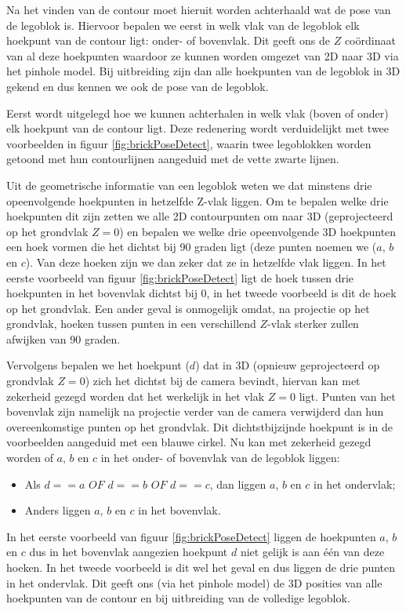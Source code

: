 Na het vinden van de contour moet hieruit worden achterhaald wat de pose van de legoblok is. Hiervoor bepalen we eerst in welk vlak van de legoblok elk hoekpunt van de contour ligt: onder- of bovenvlak. Dit geeft ons de $Z$ co\"ordinaat van al deze hoekpunten waardoor ze kunnen worden omgezet van 2D naar 3D via het pinhole model. Bij uitbreiding zijn dan alle hoekpunten van de legoblok in 3D gekend en dus kennen we ook de pose van de legoblok.

Eerst wordt uitgelegd hoe we kunnen achterhalen in welk vlak (boven of onder) elk hoekpunt van de contour ligt. Deze redenering wordt verduidelijkt met twee voorbeelden in figuur \ref{fig:brickPoseDetect}, waarin twee legoblokken worden getoond met hun contourlijnen aangeduid met de vette zwarte lijnen.

Uit de geometrische informatie van een legoblok weten we dat minstens drie opeenvolgende hoekpunten in hetzelfde Z-vlak liggen. Om te bepalen welke drie hoekpunten dit zijn zetten we alle 2D contourpunten om naar 3D (geprojecteerd op het grondvlak $Z = 0$) en bepalen we welke drie opeenvolgende 3D hoekpunten een hoek vormen die het dichtst bij 90 graden ligt (deze punten noemen we ($a$, $b$ en $c$). Van deze hoeken zijn we dan zeker dat ze in hetzelfde vlak liggen. In het eerste voorbeeld van figuur \ref{fig:brickPoseDetect} ligt de hoek tussen drie hoekpunten in het bovenvlak dichtst bij 0, in het tweede voorbeeld is dit de hoek op het grondvlak. Een ander geval is onmogelijk omdat, na projectie op het grondvlak, hoeken tussen punten in een verschillend $Z$-vlak sterker zullen afwijken van 90 graden.

Vervolgens bepalen we het hoekpunt ($d$) dat in 3D (opnieuw geprojecteerd op grondvlak $Z = 0$) zich het dichtst bij de camera bevindt, hiervan kan met zekerheid gezegd worden dat het werkelijk in het vlak $Z = 0$ ligt. Punten van het bovenvlak zijn namelijk na projectie verder van de camera verwijderd dan hun overeenkomstige punten op het grondvlak. Dit dichtstbijzijnde hoekpunt is in de voorbeelden aangeduid met een blauwe cirkel. Nu kan met zekerheid gezegd worden of $a$, $b$ en $c$ in het onder- of bovenvlak van de legoblok liggen: 
\begin{itemize}
\item Als $d == a$ $OF$ $d == b$ $OF$ $d == c$, dan liggen $a$, $b$ en $c$ in het ondervlak;
\item Anders liggen $a$, $b$ en $c$ in het bovenvlak.
\end{itemize}
In het eerste voorbeeld van figuur \ref{fig:brickPoseDetect} liggen de hoekpunten $a$, $b$ en $c$ dus in het bovenvlak aangezien hoekpunt $d$ niet gelijk is aan \'e\'en van deze hoeken. In het tweede voorbeeld is dit wel het geval en dus liggen de drie punten in het ondervlak. Dit geeft ons (via het pinhole model) de 3D posities van alle hoekpunten van de contour en bij uitbreiding van de volledige legoblok.

